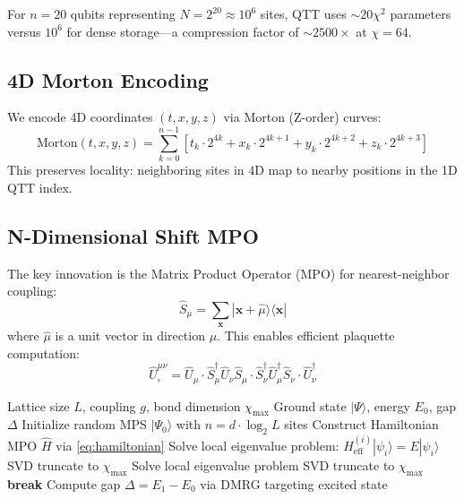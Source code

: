 \documentclass[12pt,a4paper]{article}
\newcommand{\ket}[1]{|#1\rangle}
\newcommand{\bra}[1]{\langle#1|}
\begin{document}
For $n = 20$ qubits representing $N = 2^{20} \approx 10^6$ sites, QTT uses $\sim 20 \chi^2$ parameters versus $10^6$ for dense storage---a compression factor of $\sim 2500\times$ at $\chi = 64$.

\subsection{4D Morton Encoding}

We encode 4D coordinates $(t, x, y, z)$ via Morton (Z-order) curves:
\begin{equation}
    \text{Morton}(t, x, y, z) = \sum_{k=0}^{n-1} \left[ t_k \cdot 2^{4k} + x_k \cdot 2^{4k+1} + y_k \cdot 2^{4k+2} + z_k \cdot 2^{4k+3} \right]
\end{equation}
This preserves locality: neighboring sites in 4D map to nearby positions in the 1D QTT index.

\subsection{N-Dimensional Shift MPO}

The key innovation is the Matrix Product Operator (MPO) for nearest-neighbor coupling:
\begin{equation}
    \hat{S}_\mu = \sum_{\mathbf{x}} \ket{\mathbf{x} + \hat{\mu}}\bra{\mathbf{x}}
\end{equation}
where $\hat{\mu}$ is a unit vector in direction $\mu$. This enables efficient plaquette computation:
\begin{equation}
    \hat{U}_{\square}^{\mu\nu} = \hat{U}_\mu \cdot \hat{S}_\mu^\dagger \hat{U}_\nu \hat{S}_\mu \cdot \hat{S}_\nu^\dagger \hat{U}_\mu^\dagger \hat{S}_\nu \cdot \hat{U}_\nu^\dagger
\end{equation}

\begin{algorithm}
\caption{QTT-DMRG for Yang-Mills Ground State}
\begin{algorithmic}[1]
\Require Lattice size $L$, coupling $g$, bond dimension $\chi_{\max}$
\Ensure Ground state $\ket{\Psi}$, energy $E_0$, gap $\Delta$
\State Initialize random MPS $\ket{\Psi_0}$ with $n = d \cdot \log_2 L$ sites
\State Construct Hamiltonian MPO $\hat{H}$ via \cref{eq:hamiltonian}
        \State Solve local eigenvalue problem: $H_{\text{eff}}^{(i)} \ket{\psi_i} = E \ket{\psi_i}$
        \State SVD truncate to $\chi_{\max}$
    \EndFor
        \State Solve local eigenvalue problem
        \State SVD truncate to $\chi_{\max}$
    \EndFor
        \State \textbf{break}
    \EndIf
\EndFor
\State Compute gap $\Delta = E_1 - E_0$ via DMRG targeting excited state
\end{algorithmic}
\end{algorithm}
\end{document}
